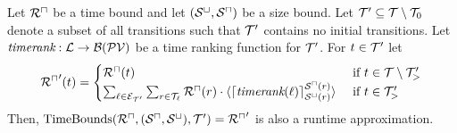 \begin{theorem}[TimeBounds]
  Let ${\mathcal{R}^\sqcap}$ be a time bound and let ${({\mathcal{S}^\sqcup}, {\mathcal{S}^\sqcap})}$ be a size bound.
  Let $\mathcal{T}' \subseteq \mathcal{T} \setminus \mathcal{T}_0$ denote a subset of all transitions such that $\mathcal{T}'$ contains no initial transitions.
  Let $\emph{timerank}: \mathcal{L} \rightarrow \mathcal{B}(\mathcal{PV})$ be a time ranking function for $\mathcal{T}'$.
  For $t \in \mathcal{T}'$ let
  \[ {\mathcal{R}^\sqcap}'(t) = 
  \begin{cases}
    {\mathcal{R}^\sqcap}(t) & \text{ if } t \in \mathcal{T} \setminus \mathcal{T}'_> \\
    \sum_{\ell \in \mathcal{E}_{\mathcal{T}'}} \sum_{r \in \mathcal{T}_\ell} {\mathcal{R}^\sqcap}(r) \cdot \langle\lceil \emph{timerank}(\ell) \rceil^{{\mathcal{S}^\sqcap}(r)}_{{\mathcal{S}^\sqcup}(r)}\rangle & \text{ if } t \in \mathcal{T}'_>
  \end{cases}
  \]
  Then, $\text{TimeBounds}({\mathcal{R}^\sqcap}, ({\mathcal{S}^\sqcap}, {\mathcal{S}^\sqcup}), \mathcal{T}') = {\mathcal{R}^\sqcap}'$ is also a runtime approximation.
\end{theorem}
